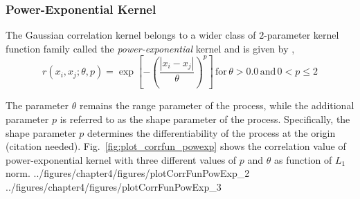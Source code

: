 \subsubsection{Power-Exponential Kernel}

The Gaussian correlation kernel belongs to a wider class of $2$-parameter kernel function family called the \emph{power-exponential} kernel and is given by \cite{Roustant2012,Santner2003,Rasmussen2006},
\begin{equation}
	r(x_i, x_j; \theta, p) = \exp{\left[ - \left( \frac{|x_i - x_j|}{\theta} \right)^p \right]} \, \text{for} \, \theta > 0.0 \, \text{and} \, 0 < p \leq 2
\label{eq:powexp_kernel}
\end{equation}

The parameter $\theta$ remains the range parameter of the process, while the additional parameter $p$ is referred to as the shape parameter of the process.
Specifically, the shape parameter $p$ determines the differentiability of the process at the origin (citation needed).
Fig.~\ref{fig:plot_corrfun_powexp} shows the correlation value of power-exponential kernel with three different values of $p$ and $\theta$ as function of $L_1$ norm.
{../figures/chapter4/figures/plotCorrFunPowExp_2}
{../figures/chapter4/figures/plotCorrFunPowExp_3}

